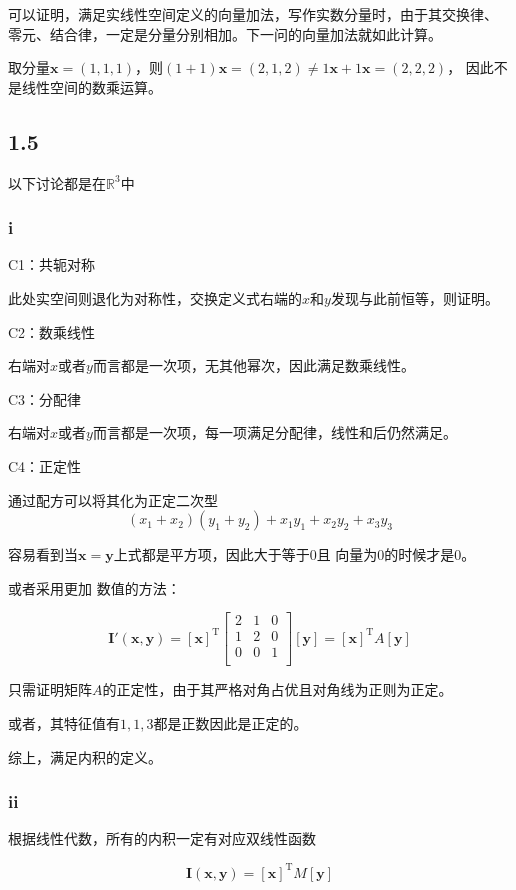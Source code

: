 \documentclass[UTF8,zihao=5]{ctexart}
\newcommand{\bm}[1]{{\mathbf{#1}}}
\newcommand{\trans}[0]{^\mathrm{T}}
\begin{document}
可以证明，满足实线性空间定义的向量加法，写作实数分量时，由于其交换律、
零元、结合律，一定是分量分别相加。下一问的向量加法就如此计算。

取分量$\bm{x}=(1,1,1)$，则$(1+1)\bm{x}=(2,1,2)\neq 1\bm{x} + 1\bm{x}=(2,2,2)$，
因此不是线性空间的数乘运算。

\subsection*{1.5}
以下讨论都是在$\mathbb{R}^3$中

\subsubsection*{i}

C1：共轭对称

此处实空间则退化为对称性，交换定义式右端的$x$和$y$发现与此前恒等，则证明。

C2：数乘线性

右端对$x$或者$y$而言都是一次项，无其他幂次，因此满足数乘线性。

C3：分配律

右端对$x$或者$y$而言都是一次项，每一项满足分配律，线性和后仍然满足。

C4：正定性

通过配方可以将其化为正定二次型
$$
(x_1+x_2)(y_1+y_2)+x_1y_1+x_2y_2+x_3y_3
$$

容易看到当$\bm{x}=\bm{y}$上式都是平方项，因此大于等于0且
向量为0的时候才是0。

或者采用更加
数值的方法：

$$
\bm{I'(x,y)}
=
[\bm{x}]\trans
\begin{bmatrix}
    2&1&0\\
    1&2&0\\
    0&0&1\\
\end{bmatrix}
[\bm{y}]=[\bm{x}]\trans
A
[\bm{y}]
$$

只需证明矩阵$A$的正定性，由于其严格对角占优且对角线为正则为正定。

或者，其特征值有$1,1,3$都是正数因此是正定的。

综上，满足内积的定义。

\subsubsection*{ii}

根据线性代数，所有的内积一定有对应双线性函数

\begin{equation}
\bm{I(x,y)}
=
[\bm{x}]\trans
M
[\bm{y}]
\label{eq:1}
\end{equation}
\end{document}
